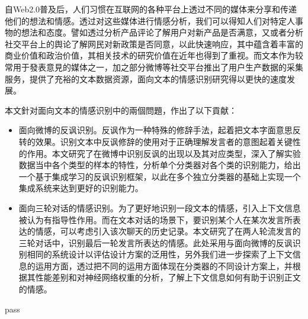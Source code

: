 \begin{cabstract}

自Web2.0普及后，人们习惯在互联网的各种平台上透过不同的媒体来分享和传递他们的想法和情感。透过对这些媒体进行情感分析，我们可以得知人们对特定人事物的想法和态度。譬如透过分析产品评论了解用户对新产品是否满意，又或者分析社交平台上的舆论了解网民对新政策是否同意，以此快速响应，其中蕴含着丰富的商业价值和政治价值，其相关技术的研究价值在近年也得到了重视。而文本作为较常用于發表意見的媒体之一，加之部分微博等社交平台推出了用户生产数据的采集服务，提供了充裕的文本数据资源，面向文本的情感识别研究得以更快的速度发展。

本文針对面向文本的情感识别中的兩個問題，作出了以下貢献：

\begin{itemize}

\item 面向微博的反讽识别。反讽作为一种特殊的修辞手法，起着把文本字面意思反转的效果。识别文本中反讽修辞的使用对于正确理解发言者的意图起着关键性的作用。本文研究了在微博中识别反讽的出现以及其对应类型，深入了解实验数据当中各个类型的样本的特性，分析单个分类器对各个类的识别能力，给出一个基于集成学习的反讽识别框架，以此在多个独立分类器的基础上实现一个集成系统来达到更好的识别能力。

\item 面向三轮对话的情感识别。为了更好地识别一段文本的情感，引入上下文信息被认为有指导性作用。而在文本对话的场景下，要识别某个人在某次发言所表达的情感，可以考虑引入该次聊天的历史记录。本文研究了在两人轮流发言的三轮对话中，识别最后一轮发言所表达的情感。此处采用与面向微博的反讽识别相同的系统设计以评估设计方案的泛用性，另外我们进一步探索了上下文信息的运用方面，透过把不同的运用方面体现在分类器的不同设计方案上，并根据其性能差别和对神经网络权重的分析，了解上下文信息如何有助于识别正文的情感。
\end{itemize}


\end{cabstract}


\begin{eabstract}
   
   pass

\end{eabstract}

